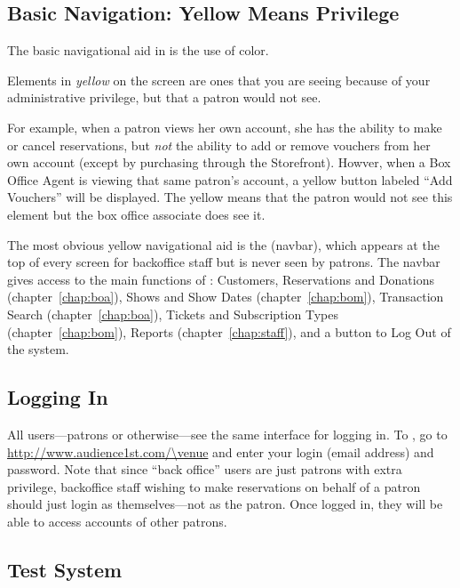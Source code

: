 \subsection{Basic Navigation: Yellow Means Privilege}
\label{sec:navigation}

The basic navigational aid in \af is the use of color.

Elements in \emph{yellow} on the screen are ones
that you are seeing because of your administrative
privilege, but that a patron would not see.

For example, when a patron views her own account, she has the ability to
make or cancel reservations, but \emph{not} the ability to add or remove
vouchers from her own account (except by purchasing through the
Storefront).  Howver, when a Box Office Agent is viewing that same
patron's account, a yellow button labeled ``Add Vouchers''
will be displayed.  The yellow means that the patron would not see this
element but the box office associate does see it.

The most obvious yellow navigational aid is the 
(navbar), 
which appears at the top of every screen for backoffice staff but is never
seen by patrons.  The navbar gives access to the  main functions of \af:
Customers, Reservations and Donations (chapter~\ref{chap:boa}), Shows and Show Dates
(chapter~\ref{chap:bom}), Transaction Search (chapter~\ref{chap:boa}),
Tickets and Subscription Types (chapter~\ref{chap:bom}), Reports
(chapter~\ref{chap:staff}), and a button to Log Out of the system.


\subsection{Logging In}
\label{sec:login}

All users---patrons or otherwise---see the same interface for logging
in.  To , go to \url{http://www.audience1st.com/\venue} and enter your
login (email address) and password.  Note that since ``back office''
users are just patrons with extra privilege, backoffice staff wishing to
make reservations on behalf of a patron should just login as
themselves---not as the patron.  Once logged in, they will be able to
access accounts of other patrons.

\subsection{Test System}
\label{sec:test}

